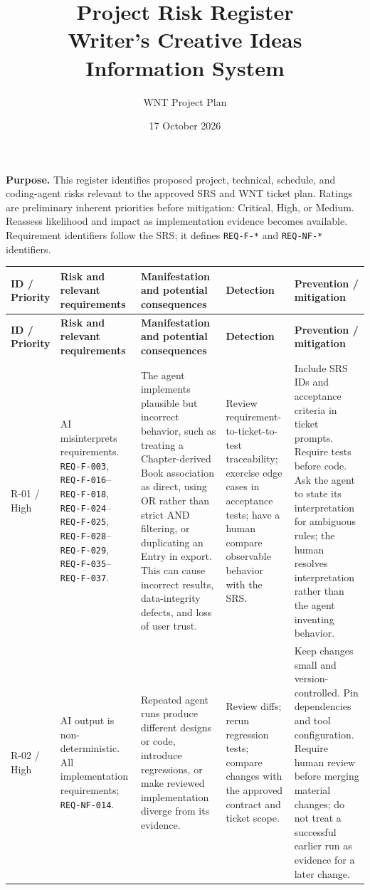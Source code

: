 \documentclass[10pt,a4paper]{article}
\title{Project Risk Register\\[0.3em]
\large Writer's Creative Ideas Information System}
\author{WNT Project Plan}
\date{17 October 2026}
\begin{document}
\maketitle

\textbf{Purpose.} This register identifies proposed project, technical, schedule,
and coding-agent risks relevant to the approved SRS and WNT ticket plan. Ratings
are preliminary inherent priorities before mitigation: Critical, High, or
Medium. Reassess likelihood and impact as implementation evidence becomes
available. Requirement identifiers follow the SRS; it defines \texttt{REQ-F-*}
and \texttt{REQ-NF-*} identifiers.

\small
\begin{longtable}{|L{1.15cm}|L{3.1cm}|L{5.6cm}|L{4.4cm}|L{7.1cm}|}
\hline
\textbf{ID / Priority} & \textbf{Risk and relevant requirements} &
\textbf{Manifestation and potential consequences} & \textbf{Detection} &
\textbf{Prevention / mitigation} \\
\hline
\endfirsthead
\hline
\textbf{ID / Priority} & \textbf{Risk and relevant requirements} &
\textbf{Manifestation and potential consequences} & \textbf{Detection} &
\textbf{Prevention / mitigation} \\
\hline
\endhead

R-01 / High &
AI misinterprets requirements. \texttt{REQ-F-003}, \texttt{REQ-F-016}--\texttt{REQ-F-018}, \texttt{REQ-F-024}--\texttt{REQ-F-025}, \texttt{REQ-F-028}--\texttt{REQ-F-029}, \texttt{REQ-F-035}--\texttt{REQ-F-037}. &
The agent implements plausible but incorrect behavior, such as treating a Chapter-derived Book association as direct, using OR rather than strict AND filtering, or duplicating an Entry in export. This can cause incorrect results, data-integrity defects, and loss of user trust. &
Review requirement-to-ticket-to-test traceability; exercise edge cases in acceptance tests; have a human compare observable behavior with the SRS. &
Include SRS IDs and acceptance criteria in ticket prompts. Require tests before code. Ask the agent to state its interpretation for ambiguous rules; the human resolves interpretation rather than the agent inventing behavior. \\
\hline

R-02 / High &
AI output is non-deterministic. All implementation requirements; \texttt{REQ-NF-014}. &
Repeated agent runs produce different designs or code, introduce regressions, or make reviewed implementation diverge from its evidence. &
Review diffs; rerun regression tests; compare changes with the approved contract and ticket scope. &
Keep changes small and version-controlled. Pin dependencies and tool configuration. Require human review before merging material changes; do not treat a successful earlier run as evidence for a later change. \\
\hline


\end{longtable}
\end{document}
